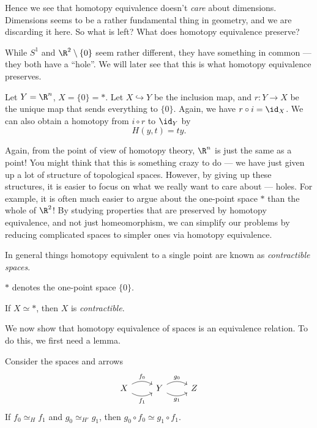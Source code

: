 \documentclass[a4paper]{article}
\begin{document}
Hence we see that homotopy equivalence doesn't \emph{care} about dimensions. Dimensions seems to be a rather fundamental thing in geometry, and we are discarding it here. So what is left? What does homotopy equivalence preserve?

While $S^1$ and $\R^2 \setminus \{0\}$ seem rather different, they have something in common --- they both have a ``hole''. We will later see that this is what homotopy equivalence preserves.

\begin{eg}
  Let $Y = \R^n$, $X = \{0\} = *$. Let $X\hookrightarrow Y$ be the inclusion map, and $r: Y\to X$ be the unique map that sends everything to $\{0\}$. Again, we have $r\circ i = \id_X$. We can also obtain a homotopy from $i \circ r$ to $\id_Y$ by
  \[
    H(y, t) = ty.
  \]
\end{eg}
Again, from the point of view of homotopy theory, $\R^n$ is just the same as a point! You might think that this is something crazy to do --- we have just given up a lot of structure of topological spaces. However, by giving up these structures, it is easier to focus on what we really want to care about --- holes. For example, it is often much easier to argue about the one-point space $*$ than the whole of $\R^2$! By studying properties that are preserved by homotopy equivalence, and not just homeomorphism, we can simplify our problems by reducing complicated spaces to simpler ones via homotopy equivalence.

In general things homotopy equivalent to a single point are known as \emph{contractible spaces}.
\begin{notation}
  $*$ denotes the one-point space $\{0\}$.
\end{notation}

\begin{defi}
  If $X\simeq *$, then $X$ is \emph{contractible}.
\end{defi}

We now show that homotopy equivalence of spaces is an equivalence relation. To do this, we first need a lemma.
\begin{lemma}
  Consider the spaces and arrows
  \[
    \begin{tikzcd}
      X \ar[r, bend left, "f_0"] \ar[r, bend right, "f_1"'] & Y \ar[r, bend left, "g_0"] \ar[r, bend right, "g_1"'] & Z
    \end{tikzcd}
  \]
  If $f_0\simeq_H f_1$ and $g_0\simeq_{H'} g_1$, then $g_0\circ f_0 \simeq g_1 \circ f_1$.
\end{lemma}
\end{document}
